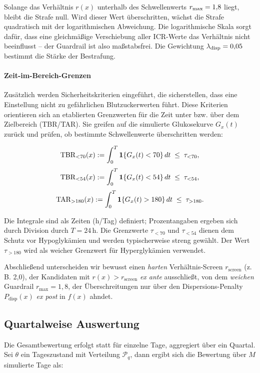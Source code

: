 \noindent Solange das Verhältnis \(r(x)\) unterhalb des Schwellenwerts \(r_{\max} = 1{,}8\) liegt, bleibt die Strafe null. Wird dieser Wert überschritten, wächst die Strafe quadratisch mit der logarithmischen Abweichung. Die logarithmische Skala sorgt dafür, dass eine gleichmäßige Verschiebung aller ICR-Werte das Verhältnis nicht beeinflusst – der Guardrail ist also maßstabsfrei. Die Gewichtung \(\lambda_{\mathrm{disp}} = 0{,}05\) bestimmt die Stärke der Bestrafung.

\paragraph{Zeit-im-Bereich-Grenzen}
Zusätzlich werden Sicherheitskriterien eingeführt, die sicherstellen, dass eine Einstellung nicht zu gefährlichen Blutzuckerwerten führt. Diese Kriterien orientieren sich an etablierten Grenzwerten für die Zeit unter bzw. über dem Zielbereich (TBR/TAR). Sie greifen auf die simulierte Glukosekurve \(G_x(t)\) zurück und prüfen, ob bestimmte Schwellenwerte\cite{jpm14040359, 10.2337/dc16-2215} überschritten werden:

\[
\mathrm{TBR}_{<70}(x) := \int_0^T \mathbf{1}\{G_x(t)<70\}\,dt \;\le\; \tau_{<70},
\]
\[
\mathrm{TBR}_{<54}(x) := \int_0^T \mathbf{1}\{G_x(t)<54\}\,dt \;\le\; \tau_{<54},
\]
\[
\mathrm{TAR}_{>180}(x) := \int_0^T \mathbf{1}\{G_x(t)>180\}\,dt \;\le\; \tau_{>180}.
\]

\noindent Die Integrale sind als Zeiten (h/Tag) definiert; Prozentangaben ergeben sich durch Division durch \(T=24\,\mathrm{h}\).
\noindent Die Grenzwerte \(\tau_{<70}\) und \(\tau_{<54}\) dienen dem Schutz vor Hypoglykämien und werden typischerweise streng gewählt. Der Wert \(\tau_{>180}\) wird als weicher Grenzwert für Hyperglykämien verwendet.

\noindent Abschließend unterscheiden wir bewusst einen \emph{harten} Verhältnis-Screen \(r_{\text{screen}}\) (z.\,B. 2{,}0), der Kandidaten mit \(r(x) > r_{\text{screen}}\) \emph{ex ante} ausschließt, von dem \emph{weichen} Guardrail \(r_{\max}=1{,}8\), der Überschreitungen nur über den Dispersions-Penalty \(P_{\mathrm{disp}}(x)\) \emph{ex post} in \(f(x)\) ahndet.

\subsection{Quartalweise Auswertung}

Die Gesamtbewertung erfolgt statt für einzelne Tage, aggregiert über ein Quartal. Sei \(\theta\) ein Tageszustand mit Verteilung \(\mathcal P_q\), dann ergibt sich die Bewertung über \(M\) simulierte Tage als:

